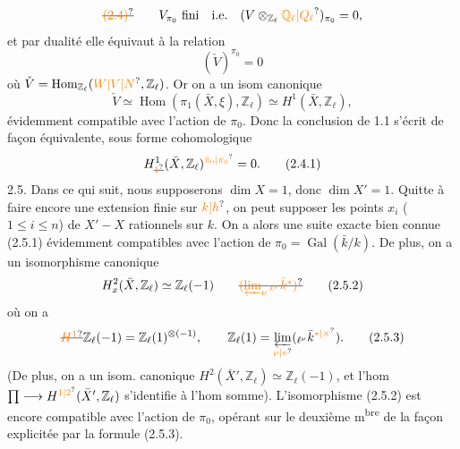 \[
\deleted{\unsure{(2.4)}}\qquad V_{\pi_0}\ \text{fini}\quad\text{i.e.}\quad (V\otimes_{\mathbb Z_\ell}\unsure{\mathbb Q_\ell|Q_\ell})_{\pi_0}=0,
\]
et par dualité elle équivaut à la relation
\[
(\check V)^{\pi_0}=0
\]
où $\check V=\operatorname{Hom}_{\mathbb Z_\ell}(\unsure{W|V|N},\mathbb Z_\ell)$. Or on a un isom canonique
\[
\check V\simeq\operatorname{Hom}(\pi_1(\bar X,\xi),\mathbb Z_\ell)\simeq H^1(\bar X,\mathbb Z_\ell),
\]
évidemment compatible avec l'action de $\pi_0$. Donc la conclusion de 1.1 s'écrit de façon équivalente, sous forme cohomologique
\[
H_{\deleted{\unsure{1}}}^1(\bar X,\mathbb Z_\ell)^{\unsure{\bar\pi_0|\pi_0}}=0.\tag*{(2.4.1)}
\]
2.5. Dans ce qui suit, nous supposerons $\dim X=1$, donc $\dim X'=1$. Quitte à faire encore une extension finie sur $\unsure{k|h}$, on peut supposer les points $x_i$ ($1\leq i\leq n$) de $X'-X$ rationnels sur $k$. On a alors une suite exacte bien connue
\noindent (2.5.1)
  évidemment compatibles avec l'action de   $\pi_0=\operatorname{Gal}(\bar k/k)$. De plus, on a un isomorphisme canonique
\[
H_x^2(\bar X,\mathbb Z_\ell)\simeq\mathbb Z_\ell(-1)\qquad \deleted{\unsure{(\varprojlim_\nu{}_{\ell^\nu}\bar k^*)}}\tag*{(2.5.2)}
\]
où on a
\[
\deleted{\unsure{H^1}}\mathbb Z_\ell(-1)=\mathbb Z_\ell(1)^{\otimes(-1)},\qquad \mathbb Z_\ell(1)=\varprojlim_{\unsure{\nu|v}}({}_{\ell^\nu}\bar k^{\unsure{*|\times}}).\tag*{(2.5.3)}
\]
(De plus, on a un isom. canonique $H^2(\bar X',\mathbb Z_\ell)\simeq\mathbb Z_\ell(-1)$, et l'hom $\prod\longrightarrow H^{\unsure{1|2}}(\bar X',\mathbb Z_\ell)$ s'identifie à l'hom somme). L'isomorphisme (2.5.2) est encore compatible avec l'action de $\pi_0$, opérant sur le deuxième m\textsuperscript{bre} de la façon explicitée par la formule (2.5.3). 

